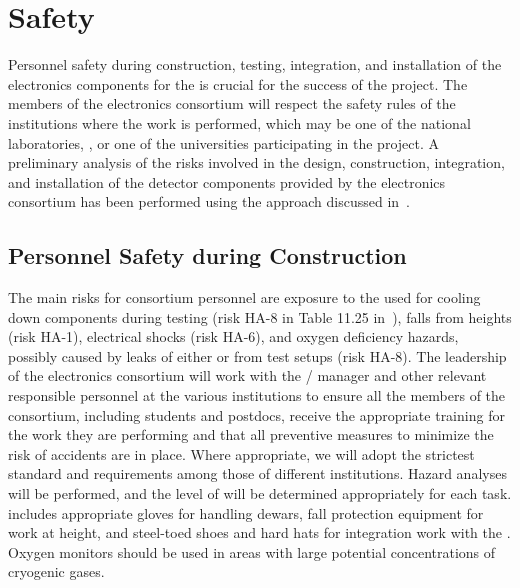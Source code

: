 \section{Safety}
\label{sec:fdsp-tpcelec-safety}

Personnel safety during construction, testing, integration,
and installation of the  electronics components for the 
  is crucial for the success
of the project. The members of the  electronics consortium will
respect the safety rules of the institutions where the work is
performed, which may be one of the national laboratories, ,
or one of the universities participating in the project. A
preliminary analysis of the risks involved in the design,
construction, integration, and installation of the detector
components provided by the  electronics consortium has been
performed using the approach discussed in~\tcchesh.


\subsection{Personnel Safety during Construction}
\label{sec:fdsp-tpcelec-safety-personnel}

The main risks for consortium personnel are exposure to
the \lntwo used for cooling down components during testing (risk HA-8
in Table 11.25 in~\tcchappx), falls from heights (risk HA-1), 
electrical shocks (risk HA-6), and oxygen deficiency hazards, possibly 
caused by leaks of either \lntwo or  from test setups (risk HA-8).
The leadership of the
 electronics consortium will work with the /
 manager and other relevant responsible personnel at the
various institutions to ensure all the members of the
consortium, including students and postdocs, receive the appropriate training for the work they
are performing and that all preventive measures to minimize
the risk of accidents are in place. Where appropriate,
we will adopt the strictest standard and requirements among
those of different institutions. Hazard analyses will be performed,
and the level of  will be determined
appropriately for each task.  includes 
appropriate gloves for handling \lntwo dewars, fall
protection equipment for work at height, and steel-toed shoes and
hard hats for integration work with the . Oxygen
monitors should be used in areas with large potential concentrations of
cryogenic gases.

